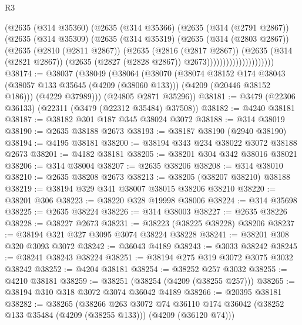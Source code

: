 \begin{lexlean}{R3}
\begin{coremodule}
                          (@2635
                            (@314 @35360)
                            (@2635
                              (@314 @35366)
                              (@2635
                                (@314 (@2791 @2867))
                                (@2635
                                  (@314 @35309)
                                  (@2635
                                    (@314 @35319)
                                    (@2635
                                      (@314 (@2803 @2867))
                                      (@2635
                                        (@2810 (@2811 @2867))
                                        (@2635
                                          (@2816 (@2817 @2867))
                                          (@2635
                                            (@314 (@2821 @2867))
                                            (@2635 (@2827 (@2828 @2867)) @2673)))))))))))))))))))))
@38174 := @38037
    (@38049
      (@38064
        (@38070
          (@38074
            @38152
            @174
            @38043
            (@38057 @133 @35645 (@4209 (@38060 @133)))
            (@4209 (@20446 @38152 @186)))
          (@4229 @37989)))
      (@24805 @2871 @35296))
@38181 := @3479 (@22306 @36133) (@22311 (@3479 (@22312 @35484) @37508))
@38182 := @4240 @38181
@38187 := @38182 @301 @187 @345 @38024 @3072
@38188 := @314 @38019
@38190 := @2635 @38188 @2673
@38193 := @38187 @38190 (@2940 @38190)
@38194 := @4195 @38181
@38200 := @38194 @343 @234 @38022 @3072 @38188 @2673
@38201 := @4182 @38181
@38205 := @38201 @304 @342 @38016 @38021
@38206 := @314 @38004
@38207 := @2635 @38206
@38208 := @314 @38010
@38210 := @2635 @38208 @2673
@38213 := @38205 (@38207 @38210) @38188
@38219 := @38194 @329 @341 @38007 @38015 @38206 @38210
@38220 := @38201 @306
@38223 := @38220 @328 @19998 @38006
@38224 := @314 @35698
@38225 := @2635 @38224
@38226 := @314 @38003
@38227 := @2635 @38226
@38228 := @38227 @2673
@38231 := @38223 (@38225 @38228) @38206
@38237 := @38194 @321 @327 @3095 @3074 @38224 @38228
@38241 := @38201 @308 @320 @3093 @3072
@38242 := @36043 @4189
@38243 := @3033 @38242
@38245 := @38241 @38243 @38224
@38251 := @38194 @275 @319 @3072 @3075 @3032 @38242
@38252 := @4204 @38181
@38254 := @38252 @257 @3032
@38255 := @4210 @38181
@38259 := @38251 (@38254 (@4209 (@38255 @257)))
@38265 := @38194 @310 @318 @3072 @3074 @36042 @4189
@38266 := @20395 @38181
@38282 := @38265
    (@38266
      @263
      @3072
      @74
      @36110
      @174
      @36042
      (@38252 @133 @35484 (@4209 (@38255 @133)))
      (@4209 (@36120 @74)))

\end{coremodule}
\end{lexlean}
